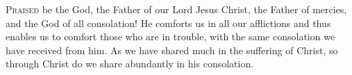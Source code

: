 \lettrine[lines=3,loversize=0.15]{P}{raised} be the God, the Father of our Lord Jesus Christ, the Father of mercies, and the God of all consolation! He comforts us in all our afflictions and thus enables us to comfort those who are in trouble, with the same consolation we have received from him. As we have shared much in the suffering of Christ, so through Christ do we share abundantly in his consolation.
